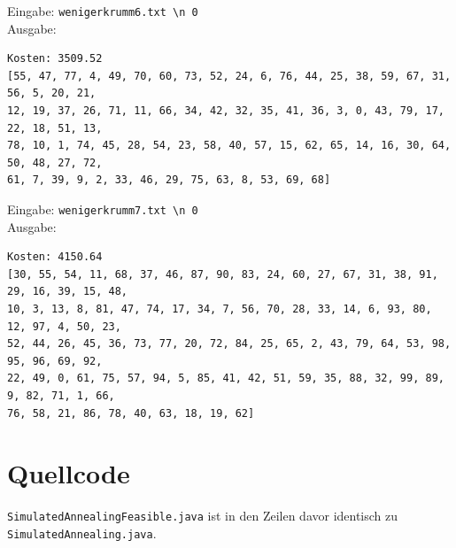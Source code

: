 \documentclass[a4paper,10pt,ngerman]{scrartcl}
\begin{document}
Eingabe: \lstinline|wenigerkrumm6.txt \n 0| \\ Ausgabe:
\begin{lstlisting}
Kosten: 3509.52
[55, 47, 77, 4, 49, 70, 60, 73, 52, 24, 6, 76, 44, 25, 38, 59, 67, 31, 56, 5, 20, 21,
12, 19, 37, 26, 71, 11, 66, 34, 42, 32, 35, 41, 36, 3, 0, 43, 79, 17, 22, 18, 51, 13, 
78, 10, 1, 74, 45, 28, 54, 23, 58, 40, 57, 15, 62, 65, 14, 16, 30, 64, 50, 48, 27, 72, 
61, 7, 39, 9, 2, 33, 46, 29, 75, 63, 8, 53, 69, 68]
\end{lstlisting}
Eingabe: \lstinline|wenigerkrumm7.txt \n 0| \\ Ausgabe:
\begin{lstlisting}
Kosten: 4150.64
[30, 55, 54, 11, 68, 37, 46, 87, 90, 83, 24, 60, 27, 67, 31, 38, 91, 29, 16, 39, 15, 48,
10, 3, 13, 8, 81, 47, 74, 17, 34, 7, 56, 70, 28, 33, 14, 6, 93, 80, 12, 97, 4, 50, 23, 
52, 44, 26, 45, 36, 73, 77, 20, 72, 84, 25, 65, 2, 43, 79, 64, 53, 98, 95, 96, 69, 92, 
22, 49, 0, 61, 75, 57, 94, 5, 85, 41, 42, 51, 59, 35, 88, 32, 99, 89, 9, 82, 71, 1, 66, 
76, 58, 21, 86, 78, 40, 63, 18, 19, 62]
\end{lstlisting}
\section{Quellcode}

\lstinline|SimulatedAnnealingFeasible.java| ist in den Zeilen davor identisch zu \lstinline|SimulatedAnnealing.java|.



\begingroup
\def\chapter*#1{}

\endgroup
\end{document}

